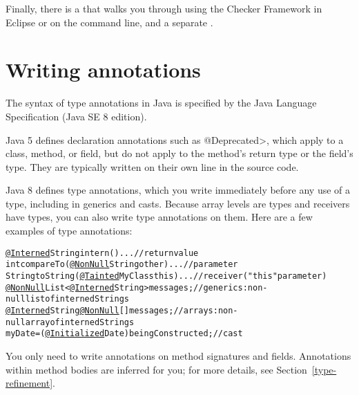 Finally, there is a
that walks you through using the Checker Framework in Eclipse or on the
command line, and a separate
.



\section{Writing annotations\label{writing-annotations}}

The syntax of type annotations in Java is specified by
the Java Language Specification (Java SE 8 edition).

Java 5 defines declaration annotations such as \<@Deprecated>, which apply
to a class, method, or field, but do not apply to the method's return type
or the field's type.  They are typically written on their own line in the
source code.

Java 8 defines type annotations, which you write immediately before any
use of a type, including in generics and casts.  Because array levels are
types and receivers have types, you can also write type annotations on
them.  Here are a few examples of type annotations:

\begin{smaller}
\begin{alltt}
  \underline{@Interned} String intern() \ttlcb{} ... \ttrcb{}               // return value
  int compareTo(\underline{@NonNull} String other) \ttlcb{} ... \ttrcb{}    // parameter
  String toString(\underline{@Tainted} MyClass this) \ttlcb{} ... \ttrcb{}  // receiver ("this" parameter)
  \underline{@NonNull} List<\underline{@Interned} String> messages;       // generics:  non-null list of interned Strings
  \underline{@Interned} String \underline{@NonNull} [] messages;          // arrays:  non-null array of interned Strings
  myDate = (\underline{@Initialized} Date) beingConstructed;  // cast
\end{alltt}
\end{smaller}

You only need to write annotations on method signatures and fields.
Annotations within method bodies are inferred for you; for more details,
see  Section~\ref{type-refinement}.

